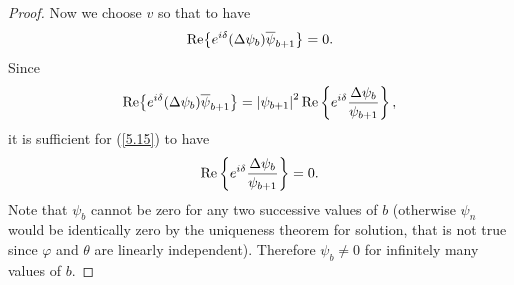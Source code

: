 \begin{proof}
Now we choose $v$ so that to have%
\begin{equation}
{\rm Re}\big\{e^{i\delta }(\Delta \psi _{b})\overline{\psi }_{b+1}\big\}=0.
\label{5.15}
\end{equation}%
Since%
\[
{\rm Re}\big\{e^{i\delta }(\Delta \psi _{b})\overline{\psi }_{b+1}\big\}=\left\vert
\psi _{b+1}\right\vert ^{2}{\rm Re}\left\{ e^{i\delta }\frac{\Delta \psi
_{b}}{\psi _{b+1}}\right\} ,
\]%
it is suf\/f\/icient for (\ref{5.15}) to have%
\begin{equation}
{\rm Re}\left\{ e^{i\delta }\frac{\Delta \psi _{b}}{\psi _{b+1}}\right\} =0.
\label{5.16}
\end{equation}%
Note that $\psi _{b}$ cannot be zero for any two successive values of $b$
(otherwise $\psi _{n}$ would be identically zero by the uniqueness theorem
for solution, that is not true since $\varphi $ and $\theta $ are linearly
independent). Therefore $\psi _{b}\neq 0$ for inf\/initely many values of $b.$


\end{proof}
